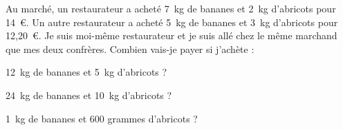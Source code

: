 \par Au marché, un restaurateur a acheté 7~kg de bananes et 2~kg d'abricots pour 14~\textgreek{\euro}. Un autre restaurateur a acheté 5~kg de bananes et 3~kg d'abricots pour 12,20~\textgreek{\euro}. Je suis moi-même restaurateur et je suis allé chez le même marchand que mes deux confrères. Combien vais-je payer si j'achète :
\begin{myenumerate}
  \item 12~kg de bananes et 5~kg d'abricots ?
  \item 24~kg de bananes et 10~kg d'abricots ?
  \item 1~kg de bananes et 600 grammes d'abricots ?
\end{myenumerate}


